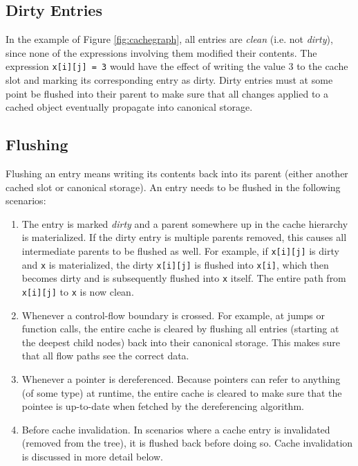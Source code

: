 \subsection{Dirty Entries}\label{sec:compilation:dirtyentries}
In the example of Figure \ref{fig:cachegraph}, all entries are \emph{clean} (i.e. not \emph{dirty}), since none of the expressions involving them modified their contents. The expression \texttt{x[i][j] = 3} would have the effect of writing the value 3 to the cache slot and marking its corresponding entry as dirty. Dirty entries must at some point be flushed into their parent to make sure that all changes applied to a cached object eventually propagate into canonical storage. 

\subsection{Flushing}\label{sec:compilation:flushing}
Flushing an entry means writing its contents back into its parent (either another cached slot or canonical storage). An entry needs to be flushed in the following scenarios:
%
\begin{enumerate}
\item The entry is marked \emph{dirty} and a parent somewhere up in the cache hierarchy is materialized. If the dirty entry is multiple parents removed, this causes all intermediate parents to be flushed as well. For example, if \texttt{x[i][j]} is dirty and \texttt{x} is materialized, the dirty \texttt{x[i][j]} is flushed into \texttt{x[i]}, which then becomes dirty and is subsequently flushed into \texttt{x} itself. The entire path from \texttt{x[i][j]} to \texttt{x} is now clean.
\item Whenever a control-flow boundary is crossed. For example, at jumps or function calls, the entire cache is cleared by flushing all entries (starting at the deepest child nodes) back into their canonical storage. This makes sure that all flow paths see the correct data.
\item Whenever a pointer is dereferenced. Because pointers can refer to anything (of some type) at runtime, the entire cache is cleared to make sure that the pointee is up-to-date when fetched by the dereferencing algorithm.
\item Before cache invalidation. In scenarios where a cache entry is invalidated (removed from the tree), it is flushed back before doing so. Cache invalidation is discussed in more detail below.
\end{enumerate}


